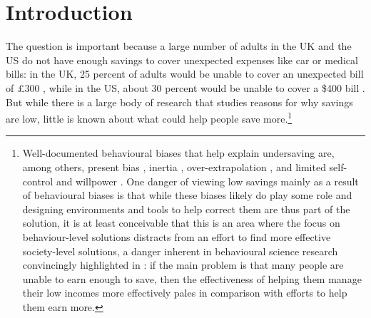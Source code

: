 \chapter*{Introduction}%
\label{cha:introduction}



The question is important because a large number of adults in the UK and the US
do not have enough savings to cover unexpected expenses like car or medical
bills: in the UK, 25 percent of adults would be unable to cover an unexpected
bill of \pounds300 \citep{philipps2021supporting}, while in the US, about 30
percent would be unable to cover a \$400 bill \citep{fed2022economic}. But
while there is a large body of research that studies reasons for why savings
are low, little is known about what could help people save
more.\footnote{Well-documented behavioural biases that help explain undersaving
    are, among others, present bias \citep{laibson1997golden,
    laibson2019intertemporal}, inertia \citep{madrian2001power},
    over-extrapolation \citep{choi2009reinforcement}, and limited self-control
    and willpower \citep{thaler1981economic, benhabib2005modeling,
    fudenberg2006dual, loewenstein2004animal, gul2001temptation}. One danger of
    viewing low savings mainly as a result of behavioural biases is that while
    these biases likely do play some role and designing environments and tools
    to help correct them are thus part of the solution, it is at least
    conceivable that this is an area where the focus on behaviour-level
    solutions distracts from an effort to find more effective society-level
    solutions, a danger inherent in behavioural science research convincingly
    highlighted in \citet{chater2022frame}: if the main problem is that many
people are unable to earn enough to save, then the effectiveness of helping
them manage their low incomes more effectively pales in comparison with efforts
to help them earn more.}

